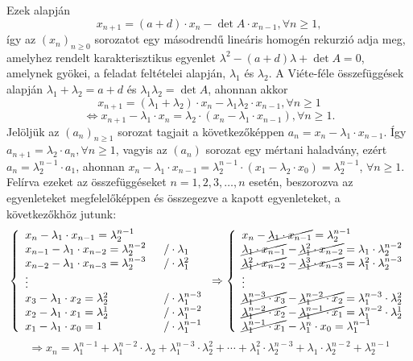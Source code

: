 \begin{solution}
Ezek alapján 
\[
x_{n+1}=(a+d)\cdot x_{n}-\det A\cdot x_{n-1},\forall n\geq1,
\]
így az $(x_{n})_{n\geq0}$ sorozatot egy másodrendű lineáris homogén
rekurzió adja meg, amelyhez rendelt karakterisztikus egyenlet $\lambda^{2}-(a+d)\lambda+\det A=0$,
amelynek gyökei, a feladat feltételei alapján, $\lambda_{1}$ és $\lambda_{2}$.
A Viéte-féle összefüggések alapján $\lambda_{1}+\lambda_{2}=a+d$
és $\lambda_{1}\lambda_{2}=\det A$, ahonnan akkor 
\[
x_{n+1}=(\lambda_{1}+\lambda_{2})\cdot x_{n}-\lambda_{1}\lambda_{2}\cdot x_{n-1},\forall n\geq1
\]
\[
\Leftrightarrow x_{n+1}-\lambda_{1}\cdot x_{n}=\lambda_{2}\cdot(x_{n}-\lambda_{1}\cdot x_{n-1}),\forall n\geq1.
\]
Jelöljük az $(a_{n})_{n\geq1}$ sorozat tagjait a következőképpen
$a_{n}=x_{n}-\lambda_{1}\cdot x_{n-1}$. Így $a_{n+1}=\lambda_{2}\cdot a_{n},\forall n\geq1$,
vagyis az $(a_{n})$ sorozat egy mértani haladvány, ezért $a_{n}=\lambda_{2}^{n-1}\cdot a_{1}$,
ahonnan $x_{n}-\lambda_{1}\cdot x_{n-1}=\lambda_{2}^{n-1}\cdot(x_{1}-\lambda_{2}\cdot x_{0})=\lambda_{2}^{n-1}$,
$\forall n\geq1$. Felírva ezeket az összefüggéseket $n=1,2,3,\ldots,n$
esetén, beszorozva az egyenleteket megfelelőképpen és összegezve a
kapott egyenleteket, a következőkhöz jutunk: 
\[
\left\{ \begin{array}{ll}
x_{n}-\lambda_{1}\cdot x_{n-1}=\lambda_{2}^{n-1}\\
x_{n-1}-\lambda_{1}\cdot x_{n-2}=\lambda_{2}^{n-2} & \phantom{x}/\cdot\lambda_{1}\\
x_{n-2}-\lambda_{1}\cdot x_{n-3}=\lambda_{2}^{n-3} & \phantom{x}/\cdot\lambda_{1}^{2}\\
\vdots\\
x_{3}-\lambda_{1}\cdot x_{2}=\lambda_{2}^{2} & \phantom{x}/\cdot\lambda_{1}^{n-3}\\
x_{2}-\lambda_{1}\cdot x_{1}=\lambda_{2}^{1} & \phantom{x}/\cdot\lambda_{1}^{n-2}\\
x_{1}-\lambda_{1}\cdot x_{0}=1 & \phantom{x}/\cdot\lambda_{1}^{n-1}
\end{array}\right.\Rightarrow\left\{ \begin{array}{l}
x_{n}-\cancel{\lambda_{1}\cdot x_{n-1}}=\lambda_{2}^{n-1}\\
\cancel{\lambda_{1}\cdot x_{n-1}}-\cancel{\lambda_{1}^{2}\cdot x_{n-2}}=\lambda_{1}\cdot\lambda_{2}^{n-2}\\
\cancel{\lambda_{1}^{2}\cdot x_{n-2}}-\cancel{\lambda_{1}^{3}\cdot x_{n-3}}=\lambda_{1}^{2}\cdot\lambda_{2}^{n-3}\\
\vdots\\
\cancel{\lambda_{1}^{n-3}\cdot x_{3}}-\cancel{\lambda_{1}^{n-2}\cdot x_{2}}=\lambda_{1}^{n-3}\cdot\lambda_{2}^{2}\\
\cancel{\lambda_{1}^{n-2}\cdot x_{2}}-\cancel{\lambda_{1}^{n-1}\cdot x_{1}}=\lambda_{1}^{n-2}\cdot\lambda_{2}^{1}\\
\cancel{\lambda_{1}^{n-1}\cdot x_{1}}-\lambda_{1}^{n}\cdot x_{0}=\lambda_{1}^{n-1}
\end{array}\right.
\]
\[
\Rightarrow x_{n}=\lambda_{1}^{n-1}+\lambda_{1}^{n-2}\cdot\lambda_{2}+\lambda_{1}^{n-3}\cdot\lambda_{2}^{2}+\cdots+\lambda_{1}^{2}\cdot\lambda_{2}^{n-3}+\lambda_{1}\cdot\lambda_{2}^{n-2}+\lambda_{2}^{n-1}
\]


\end{solution}
